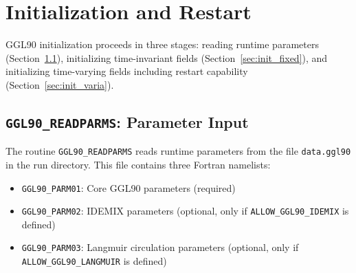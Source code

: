 \documentclass[12pt,letterpaper]{article}
\begin{document}
\section{Initialization and Restart}
\label{sec:initialization}

GGL90 initialization proceeds in three stages: reading runtime parameters (Section~\ref{sec:readparms}), initializing time-invariant fields (Section~\ref{sec:init_fixed}), and initializing time-varying fields including restart capability (Section~\ref{sec:init_varia}).

\subsection{\texttt{GGL90\_READPARMS}: Parameter Input}
\label{sec:readparms}

The routine \verb|GGL90_READPARMS| reads runtime parameters from the file \verb|data.ggl90| in the run directory. This file contains three Fortran namelists:

\begin{itemize}
\item \verb|GGL90_PARM01|: Core GGL90 parameters (required)
\item \verb|GGL90_PARM02|: IDEMIX parameters (optional, only if \verb|ALLOW_GGL90_IDEMIX| is defined)
\item \verb|GGL90_PARM03|: Langmuir circulation parameters (optional, only if \verb|ALLOW_GGL90_LANGMUIR| is defined)
\end{itemize}
\end{document}
